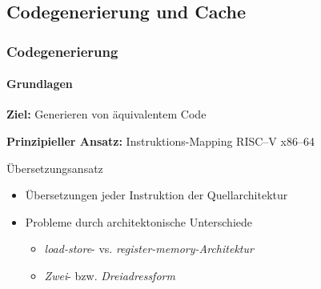 \subsection{Codegenerierung und Cache} %
\begin{frame}
	\frametitle{Codegenerierung}
	\framesubtitle{Grundlagen}
	\textbf{Ziel:} Generieren von äquivalentem Code
	
	\vspace{0.50cm}
	
	\pause
	\textbf{Prinzipieller Ansatz:} Instruktions-Mapping RISC--V \conclude x86--64
	
	\vspace{0.50cm}
	
	\begin{block}{Übersetzungsansatz}
		\begin{itemize}
			\item Übersetzungen jeder Instruktion der Quellarchitektur
			\item Probleme durch architektonische Unterschiede
			\begin{itemize}
				\item \textit{load-store}- vs. \textit{register-memory-Architektur}
				\item \textit{Zwei}- bzw. \textit{Dreiadressform}
			\end{itemize}
		\end{itemize}
	\end{block}
\end{frame}


